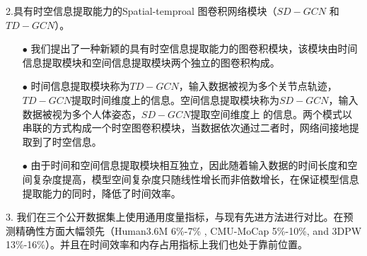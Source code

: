2.具有时空信息提取能力的Spatial-temproal 图卷积网络模块（$SD−GCN$ 和 $TD−GCN$）。
\begin{enumerate}[topsep = 0 pt, itemsep= 0 pt, parsep=0pt, partopsep=0pt, leftmargin=44pt, itemindent=0pt, labelsep=6pt]
	\item[$\bullet$] 我们提出了一种新颖的具有时空信息提取能力的图卷积模块，该模块由时间信息提取模块和空间信息提取模块两个独立的图卷积构成。
	\item[$\bullet$] 时间信息提取模块称为$TD-GCN$，输入数据被视为多个关节点轨迹，$TD-GCN$提取时间维度上的信息。空间信息提取模块称为$SD-GCN$，输入数据被视为多个人体姿态，$SD-GCN$提取空间维度上 的信息。两个模式以串联的方式构成一个时空图卷积模块，当数据依次通过二者时，网络间接地提取到了时空信息。
	\item[$\bullet$] 由于时间和空间信息提取模块相互独立，因此随着输入数据的时间长度和空间复杂度提高，模型空间复杂度只随线性增长而非倍数增长，在保证模型信息提取能力的同时，降低了时间效率。
\end{enumerate}

3. 我们在三个公开数据集上使用通用度量指标，与现有先进方法进行对比。在预测精确性方面大幅领先（Human3.6M 6\%-7\% , CMU-MoCap 5\%-10\%, and 3DPW 13\%-16\%）。并且在时间效率和内存占用指标上我们也处于靠前位置。
